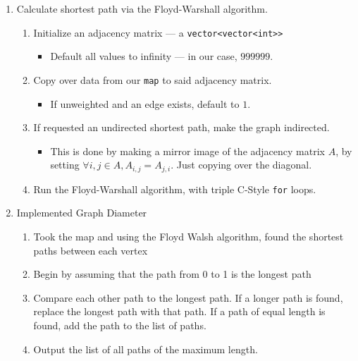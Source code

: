 \documentclass{article}
\newcommand{\shellcmd}[1]{\texttt{\colorbox{gray!30}{#1}}}
\begin{document}
\begin{enumerate}
    \item Calculate shortest path via the Floyd-Warshall algorithm.
    \begin{enumerate}
        \item Initialize an adjacency matrix --- a \shellcmd{vector<vector<int>>}
        \begin{itemize}
            \item Default all values to infinity --- in our case, $999999$.
        \end{itemize}
        \item Copy over data from our \shellcmd{map} to said adjacency matrix.
        \begin{itemize}
            \item If unweighted and an edge exists, default to $1$.
        \end{itemize}
        \item If requested an undirected shortest path, make the graph indirected.
        \begin{itemize}
            \item This is done by making a mirror image of the adjacency matrix $A$, by setting $\forall i, j \in A, A_{i, j} = A_{j, i}$. Just copying over the diagonal.
        \end{itemize}
        \item Run the Floyd-Warshall algorithm, with triple C-Style \shellcmd{for} loops.
    \end{enumerate}

    \item Implemented Graph Diameter
    \begin{enumerate}
        \item Took the map and using the Floyd Walsh algorithm, found the shortest paths between each vertex
        \item Begin by assuming that the path from 0 to 1 is the longest path
        \item Compare each other path to the longest path. If a longer path is found, replace the longest path with that path. If a path of equal length is found, add the path to the list of paths.
        \item Output the list of all paths of the maximum length.
    \end{enumerate}


\end{enumerate}
\end{document}
